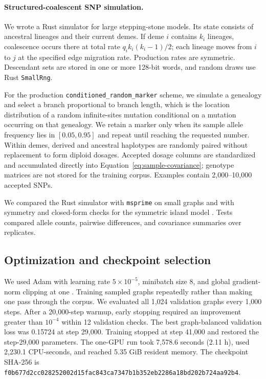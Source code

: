 \paragraph{Structured-coalescent SNP simulation.}
We wrote a Rust simulator for large stepping-stone models. Its state consists
of ancestral lineages and their current demes. If deme $i$ contains $k_i$
lineages, coalescence occurs there at total rate
$q_i k_i(k_i-1)/2$; each lineage moves from $i$ to $j$ at the specified edge
migration rate. Production rates are symmetric. Descendant sets are stored in
one or more 128-bit words, and random draws use Rust \texttt{SmallRng}.

For the production \texttt{conditioned\_random\_marker} scheme, we simulate a
genealogy and select a branch proportional to branch length, which is the
location distribution of a random infinite-sites mutation conditional on a
mutation occurring on that genealogy. We retain a marker only when its sample
allele frequency lies in $[0.05,0.95]$ and repeat until reaching the requested
number. Within demes, derived and ancestral haplotypes are randomly paired
without replacement to form diploid dosages. Accepted dosage columns are
standardized and accumulated directly into
Equation~\ref{eq:sample-covariance}; genotype matrices are not stored for the
training corpus. Examples contain 2,000--10,000 accepted SNPs.

We compared the Rust simulator with \texttt{msprime} on small graphs and with
symmetry and closed-form checks for the symmetric island model
\citep{baum2022efficient}. Tests compared allele counts, pairwise differences,
and covariance summaries over replicates.

\subsection{Optimization and checkpoint selection}

We used Adam with learning rate $5\times10^{-5}$, minibatch size 8, and global
gradient-norm clipping at one \citep{kingma2015adam}. Training sampled graphs
repeatedly rather than making one pass through the corpus. We evaluated all
1,024 validation graphs every 1,000 steps. After a 20,000-step warmup, early
stopping required an improvement greater than $10^{-4}$ within 12 validation
checks. The best graph-balanced validation loss was 0.15724 at step 29,000.
Training stopped at step 41,000 and restored the step-29,000 parameters. The
one-GPU run took 7,578.6 seconds (2.11 h), used 2,230.1 CPU-seconds, and reached
5.35 GiB resident memory. The checkpoint SHA-256 is
\texttt{f0b677d2cc028252002d15fac843ca7347b1b352eb2286a18bd202b724aa92b4}.

